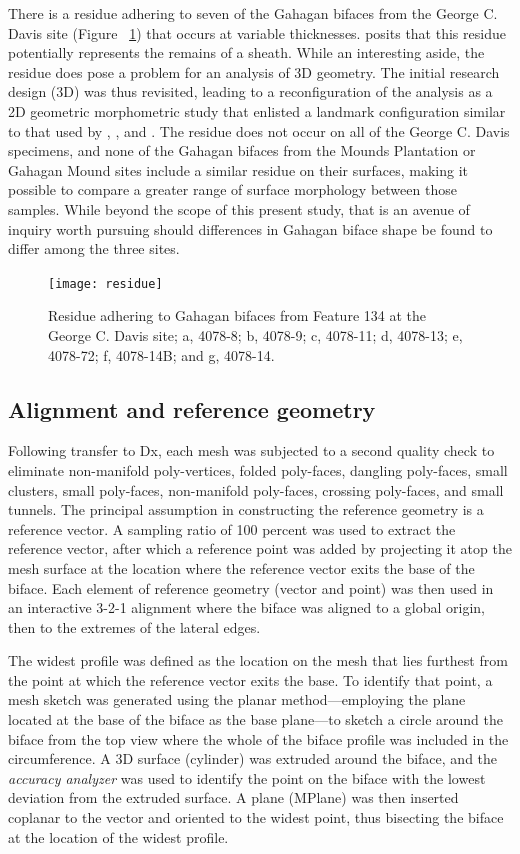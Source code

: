 \documentclass[review]{elsarticle}
\begin{document}
There is a residue adhering to seven of the Gahagan bifaces from the George C. Davis site (Figure ~\ref{fig:FigResidue}) that occurs at variable thicknesses. \citet[228]{RN3682} posits that this residue potentially represents the remains of a sheath. While an interesting aside, the residue does pose a problem for an analysis of 3D geometry. The initial research design (3D) was thus revisited, leading to a reconfiguration of the analysis as a 2D geometric morphometric study that enlisted a landmark configuration similar to that used by \citet[Figure 2]{RN1754}, \citet[Figure 2]{RN1736}, and \citet[Figure 1]{RN11731}. The residue does not occur on all of the George C. Davis specimens, and none of the Gahagan bifaces from the Mounds Plantation or Gahagan Mound sites include a similar residue on their surfaces, making it possible to compare a greater range of surface morphology between those samples. While beyond the scope of this present study, that is an avenue of inquiry worth pursuing should differences in Gahagan biface shape be found to differ among the three sites.

\begin{figure}[ht]\centering
\texttt{[image: residue]}
\caption{Residue adhering to Gahagan bifaces from Feature 134 at the George C. Davis site; a, 4078-8; b, 4078-9; c, 4078-11; d, 4078-13; e, 4078-72; f, 4078-14B; and g, 4078-14.}
\label{fig:FigResidue}
\end{figure}

\subsection{Alignment and reference geometry}

Following transfer to Dx, each mesh was subjected to a second quality check to eliminate non-manifold poly-vertices, folded poly-faces, dangling poly-faces, small clusters, small poly-faces, non-manifold poly-faces, crossing poly-faces, and small tunnels. The principal assumption in constructing the reference geometry is a reference vector. A sampling ratio of 100 percent was used to extract the reference vector, after which a reference point was added by projecting it atop the mesh surface at the location where the reference vector exits the base of the biface. Each element of reference geometry (vector and point) was then used in an interactive 3-2-1 alignment where the biface was aligned to a global origin, then to the extremes of the lateral edges. 

The widest profile was defined as the location on the mesh that lies furthest from the point at which the reference vector exits the base. To identify that point, a mesh sketch was generated using the planar method---employing the plane located at the base of the biface as the base plane---to sketch a circle around the biface from the top view where the whole of the biface profile was included in the circumference. A 3D surface (cylinder) was extruded around the biface, and the \textit{accuracy analyzer} was used to identify the point on the biface with the lowest deviation from the extruded surface. A plane (MPlane) was then inserted coplanar to the vector and oriented to the widest point, thus bisecting the biface at the location of the widest profile.
\end{document}
